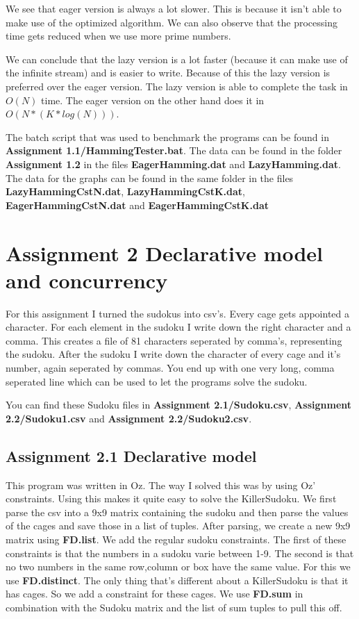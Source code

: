 \documentclass[12pt, a4paper]{article}
\begin{document}
We see that eager version is always a lot slower. This is because it isn't able to make use of the optimized algorithm. We can also observe that the processing time gets reduced when we use more prime numbers.

We can conclude that the lazy version is a lot faster (because it can make use of the infinite stream) and is easier to write. Because of this the lazy version is preferred over the eager version.
The lazy version is able to complete the task in $O(N)$ time. The eager version on the other hand does it in $O(N * (K * log(N)))$.

The batch script that was used to benchmark the programs can be found in \textbf{Assignment 1.1/HammingTester.bat}. The data can be found in the folder \textbf{Assignment 1.2} in the files \textbf{EagerHamming.dat} and \textbf{LazyHamming.dat}. The data for the graphs can be found in the same folder in the files \textbf{LazyHammingCstN.dat}, \textbf{LazyHammingCstK.dat}, \textbf{EagerHammingCstN.dat} and \textbf{EagerHammingCstK.dat}
\section*{Assignment 2 Declarative model and concurrency}
For this assignment I turned the sudokus into csv's. Every cage gets appointed a character. For each element in the sudoku I write down the right character and a comma. This creates a file of 81 characters seperated by comma's, representing the sudoku. After the sudoku I write down the character of every cage and it's number, again seperated by commas. You end up with one very long, comma seperated line which can be used to let the programs solve the sudoku.

You can find these Sudoku files in \textbf{Assignment 2.1/Sudoku.csv}, \textbf{Assignment 2.2/Sudoku1.csv} and \textbf{Assignment 2.2/Sudoku2.csv}.
\subsection*{Assignment 2.1 Declarative model}
This program was written in Oz. The way I solved this was by using Oz' constraints. Using this makes it quite easy to solve the KillerSudoku. We first parse the csv into a 9x9 matrix containing the sudoku and then parse the values of the cages and save those in a list of tuples. After parsing, we create a new 9x9 matrix using \textbf{FD.list}. We add the regular sudoku constraints. The first of these constraints is that the numbers in a sudoku varie between 1-9. The second is that no two numbers in the same row,column or box have the same value. For this we use \textbf{FD.distinct}. The only thing that's different about a KillerSudoku is that it has cages. So we add a constraint for these cages. We use \textbf{FD.sum} in combination with the Sudoku matrix and the list of sum tuples to pull this off.
\end{document}
